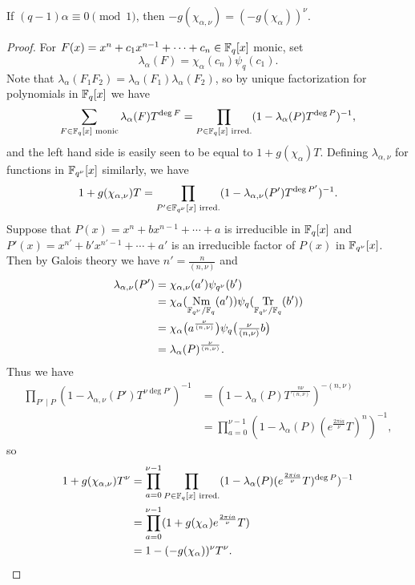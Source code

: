 \documentclass[letterpaper,11pt]{article}
\DeclareMathOperator{\Nm}{Nm}
\DeclareMathOperator{\Tr}{Tr}
\begin{document}
\begin{thm} If $(q-1)\alpha \equiv 0 \pmod{1}$, then $-g(\chi_{\alpha,\nu}) = (-g(\chi_{\alpha}))^{\nu}$.
\end{thm}
\begin{proof} For $F(x) = x^n + c_1x^{n-1} + \cdots + c_n \in \mathbb{F}_q[x]$ monic, set
\[
\lambda_{\alpha}(F) = \chi_{\alpha}(c_n)\psi_q(c_1).
\]
Note that $\lambda_{\alpha}(F_1F_2) = \lambda_{\alpha}(F_1)\lambda_{\alpha}(F_2)$, so by unique factorization for polynomials in $\mathbb{F}_q[x]$ we have
\[
\sum_{F \in \mathbb{F}_q[x]\text{ monic}} \lambda_\alpha(F)T^{\deg F} = \prod_{P\in \mathbb{F}_q[x]\text{ irred.}} (1-\lambda_\alpha(P)T^{\deg P})^{-1},
\]
and the left hand side is easily seen to be equal to $1 + g(\chi_\alpha)T$.
Defining $\lambda_{\alpha,\nu}$ for functions in $\mathbb{F}_{q^\nu}[x]$ similarly, we have
\[
1 + g(\chi_{\alpha,\nu})T = \prod_{P'\in\mathbb{F}_{q^\nu}[x]\text{ irred.}} (1-\lambda_{\alpha,\nu}(P')T^{\deg P'})^{-1}.
\]
Suppose that $P(x) = x^n + bx^{n-1} + \cdots + a$ is irreducible in $\mathbb{F}_q[x]$ and $P'(x) = x^{n'} + b'x^{n'-1} + \cdots + a'$ is an irreducible factor of $P(x)$ in $\mathbb{F}_{q^\nu}[x]$. Then by Galois theory we have $n' = \frac{n}{(n,\nu)}$ and
\begin{align*}
\lambda_{\alpha,\nu}(P') &= \chi_{\alpha,\nu}(a')\psi_{q^\nu}(b')\\
&= \chi_\alpha(\Nm_{\FF_{q^\nu}/\FF_q}(a'))\psi_q(\Tr_{\FF_{q^\nu}/\FF_q}(b'))\\
&= \chi_\alpha\big(a^\frac{\nu}{(n,\nu)}\big)\psi_q\big(\tfrac{\nu}{(n,\nu)}b\big)\\
&= \lambda_\alpha(P)^{\frac{\nu}{(n,\nu)}}.
\end{align*}
Thus we have
\begin{align*}
\prod_{P'\mid P} (1-\lambda_{\alpha,\nu}(P')T^{\nu \deg P'})^{-1} &= (1-\lambda_\alpha(P)T^\frac{n\nu}{(n,\nu)})^{-(n,\nu)}\\
&= \prod_{a=0}^{\nu-1} (1-\lambda_\alpha(P)(e^{\frac{2\pi ia}{\nu}}T)^n)^{-1},
\end{align*}
so
\begin{align*}
1 + g(\chi_{\alpha,\nu})T^\nu &= \prod_{a=0}^{\nu-1}\prod_{P\in\mathbb{F}_q[x]\text{ irred.}}(1-\lambda_\alpha(P)(e^{\frac{2\pi ia}{\nu}}T)^{\deg P})^{-1}\\
&= \prod_{a=0}^{\nu-1} (1+g(\chi_\alpha)e^{\frac{2\pi ia}{\nu}}T)\\
&= 1-(-g(\chi_\alpha))^\nu T^\nu.\qedhere
\end{align*}
\end{proof}
\end{document}
